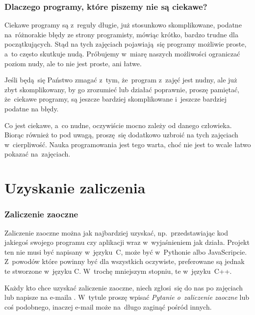 \documentclass[10pt,t]{beamer}
\begin{document}
\begin{frame}
  \frametitle{Dlaczego programy, które piszemy nie są ciekawe?}


  Ciekawe programy są z~reguły długie, już stosunkowo skomplikowane, podatne
  na~różnorakie błędy ze strony programisty, mówiąc krótko, bardzo trudne
  dla początkujących. Stąd na tych zajęciach pojawiają~się programy
  możliwie proste, a~to często skutkuje nudą. Próbujemy w~miarę naszych
  możliwości ograniczać poziom nudy, ale to nie jest proste, ani łatwe.

  Jeśli będą~się Państwo zmagać z~tym, że~program z~zajęć jest nudny,
  ale już zbyt skomplikowany, by go zrozumieć lub działać poprawnie, proszę
  pamiętać, że~ciekawe programy, są jeszcze bardziej skomplikowane i~jeszcze
  bardziej podatne na błędy.

  Co jest ciekawe, a~co nudne, oczywiście mocno zależy od danego człowieka.
  Biorąc również to pod uwagą, proszę~się dodatkowo uzbroić na tych
  zajęciach w~cierpliwość. Nauka programowania jest tego warta, choć nie
  jest to wcale łatwo pokazać na~zajęciach.

\end{frame}










\section{Uzyskanie zaliczenia}


\begin{frame}
  \frametitle{Zaliczenie zaoczne}


  Zaliczenie zaoczne można jak najbardziej uzyskać, np.~przedstawiając
  kod jakiegoś swojego programu czy aplikacji wraz w~wyjaśnieniem jak
  działa. Projekt ten \alert{nie musi} być napisany w~języku~C, może być
  w~Pythonie albo JavaScripcie. Z~powodów które powinny być dla wszystkich
  oczywiste, preferowane są jednak te stworzone w~języku C. W~trochę
  mniejszym stopniu, te w~języku~C++.

  Każdy kto chce uzyskać zaliczenie zaoczne, niech zgłosi~się do nas po
  zajęciach lub napisze na e-maila \email. W~tytule proszę wpisać
  \textit{Pytanie o~zaliczenie zaoczne} lub coś podobnego, inaczej e-mail
  może na~długo zaginąć pośród innych.

\end{frame}
\end{document}
